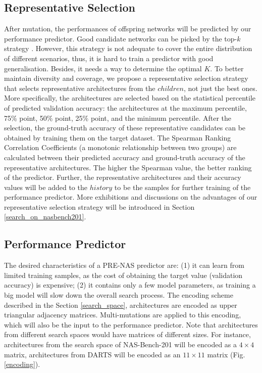 \documentclass[sigconf]{acmart}
\begin{document}
\subsection{Representative Selection}
After mutation, the performances of offspring networks will be predicted by our performance predictor. Good candidate networks can be picked by the top-$k$ strategy \cite{Ref:40,Ref:31,Ref:41}.  However, this strategy is not adequate to cover the entire distribution of different scenarios, thus, it is hard to train a predictor with good generalisation. Besides, it needs a way to determine the optimal $K$.  To better maintain diversity and coverage, we propose a representative selection strategy that selects representative architectures from the $children$, not just the best ones.  More specifically, the architectures are selected based on the statistical percentile of predicted validation accuracy: the architectures at the maximum percentile, 75\% point, 50\% point, 25\% point, and the minimum percentile. After the selection, the ground-truth accuracy of these representative candidates can be obtained by training them on the target dataset. The Spearman Ranking Correlation Coefficients (a monotonic relationship between two groups) are calculated between their predicted accuracy and ground-truth accuracy of the representative architectures. The higher the Spearman value, the better ranking of the predictor. Further, the representative architectures and their accuracy values will be added to the $history$ to be the samples for further training of the performance predictor. More exhibitions and discussions on the advantages of our representative selection strategy will be introduced in Section \ref{search_on_nasbench201}.



\subsection{Performance Predictor}
\label{sec-predictor}
The desired characteristics of a PRE-NAS predictor are: (1) it can learn from limited training samples, as the cost of obtaining the target value (validation accuracy) is expensive; (2) it contains only a few model parameters, as training a big model will slow down the overall search process.
The encoding scheme described in the Section \ref{search_space}, architectures are encoded as upper triangular adjacency matrices. Multi-mutations are applied to this encoding, which will also be the input to the performance predictor.  Note that architectures from different search spaces would have matrices of different sizes.  For instance, architectures from the search space of NAS-Bench-201 will be encoded as a $4 \times 4$ matrix, architectures from DARTS will be encoded as an $11 \times 11$ matrix (Fig. \ref{encoding}). 
\end{document}
